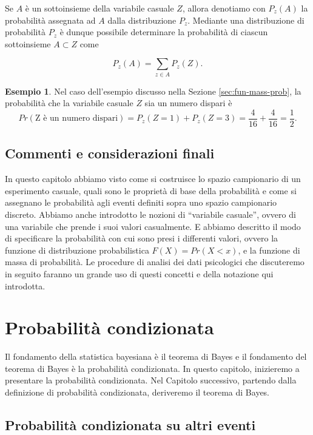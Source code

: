 \documentclass[
  11pt,
]{krantz}
\theoremstyle{definition}
\theoremstyle{definition}
\newtheorem{example}{Esempio}[chapter]
\theoremstyle{definition}
\theoremstyle{definition}
\theoremstyle{remark}
\begin{document}
Se \(A\) è un sottoinsieme della variabile casuale \(Z\), allora denotiamo con \(P_{z}(A)\) la probabilità assegnata ad \(A\) dalla distribuzione \(P_{z}\). Mediante una distribuzione di probabilità \(P_{z}\) è dunque possibile determinare la probabilità di ciascun sottoinsieme \(A \subset Z\) come

\[
P_{z}(A) = \sum_{z \in A} P_{z}(Z).
\]

\begin{example}
Nel caso dell'esempio discusso nella Sezione \ref{sec:fun-mass-prob}, la probabilità che la variabile casuale \(Z\) sia un numero dispari è \[
Pr(\text{Z è un numero dispari}) = P_{z}(Z = 1) + P_{z}(Z = 3) = \frac{4}{16} + \frac{4}{16} = \frac{1}{2}.
\]
\end{example}

\hypertarget{commenti-e-considerazioni-finali}{%
\section*{Commenti e considerazioni finali}\label{commenti-e-considerazioni-finali}}


In questo capitolo abbiamo visto come si costruisce lo spazio campionario di un esperimento casuale, quali sono le proprietà di base della probabilità e come si assegnano le probabilità agli eventi definiti sopra uno spazio campionario discreto. Abbiamo anche introdotto le nozioni di ``variabile casuale'', ovvero di una variabile che prende i suoi valori casualmente. E abbiamo descritto il modo di specificare la probabilità con cui sono presi i differenti valori, ovvero la funzione di distribuzione probabilistica \(F(X) = Pr(X < x)\), e la funzione di massa di probabilità. Le procedure di analisi dei dati psicologici che discuteremo in seguito faranno un grande uso di questi concetti e della notazione qui introdotta.

\hypertarget{chapter-prob-cond}{%
\chapter{Probabilità condizionata}\label{chapter-prob-cond}}

Il fondamento della statistica bayesiana è il teorema di Bayes e il fondamento del teorema di Bayes è la probabilità condizionata. In questo capitolo, inizieremo a presentare la probabilità condizionata. Nel Capitolo successivo, partendo dalla definizione di probabilità condizionata, deriveremo il teorema di Bayes.

\hypertarget{sec:bayes-cancer}{%
\section{Probabilità condizionata su altri eventi}\label{sec:bayes-cancer}}
\end{document}
